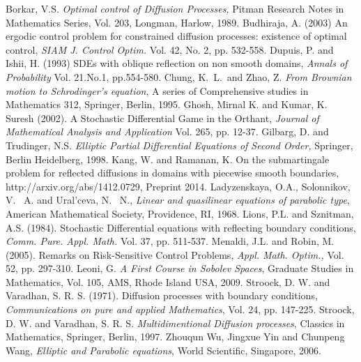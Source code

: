 \documentclass[11pt]{amsart}
\numberwithin{equation}{section}
\begin{document}
\begin{thebibliography}{99}
Borkar, V.S. {\it Optimal control of Diffusion Processes,} Pitman Research Notes in Mathematics Series, Vol. 203, Longman, Harlow, 1989.
 Budhiraja, A. (2003) An ergodic control problem for constrained diffusion processes: 
existence of optimal control, {\it SIAM J. Control Optim.} Vol. 42, No. 2, pp. 532-558.
 Dupuis, P. and Ishii, H. (1993) SDEs with oblique reflection on non smooth domains,
{\it Annals of Probability} Vol. 21.No.1, pp.554-580.
 Chung, K.\ L.\ and Zhao, Z. {\it From Brownian motion to Schrodinger's equation}, 
A series of Comprehensive studies in Mathematics 312, Springer, Berlin, 1995.
Ghosh, Mirnal K. and Kumar, K. Suresh (2002). A Stochastic Differential Game in the Orthant, {\it Journal of Mathematical Analysis and Application} Vol. 265, pp. 12-37.
Gilbarg, D. and Trudinger, N.S. {\it Elliptic Partial Differential Equations of Second Order,} Springer, 
Berlin Heidelberg, 1998. 
 Kang, W. and Ramanan, K. On the submartingale problem for reflected 
diffusions in domains with piecewise smooth boundaries, http://arxiv.org/abs/1412.0729, Preprint 2014.
 Ladyzenskaya, O.A., Solonnikov, V. \ A. and Ural'ceva, N. \ N.,
\textit{ Linear and quasilinear equations of parabolic type}, American Mathematical Society, Providence,
RI, 1968.
Lions, P.L. and Sznitman, A.S. (1984). Stochastic Differential equations with reflecting boundary conditions,
{\it Comm. Pure. Appl. Math.} Vol. 37, pp. 511-537.
Menaldi, J.L. and Robin, M. (2005). Remarks on Risk-Sensitive Control Problems, {\it Appl. Math. Optim.,} Vol. 52, pp. 297-310.
Leoni, G.  {\it A First Course in Sobolev Spaces}, Graduate Studies in Mathematics, Vol. 105, AMS,
Rhode Island USA, 2009.
Stroock, D. W. and Varadhan, S. R. S. (1971). Diffusion processes with
boundary conditions, {\it Communications on pure and applied Mathematics}, Vol. 24, pp. 147-225.
Stroock, D. W. and Varadhan, S. R. S. {\it Multidimentional Diffusion processes}, Classics in Mathematics,
Springer, Berlin, 1997.
 Zhouqun Wu, Jingxue Yin and Chunpeng Wang, {\it Elliptic and Parabolic equations},
World Scientific, Singapore, 2006. 

\end{thebibliography} 
\end{document}
